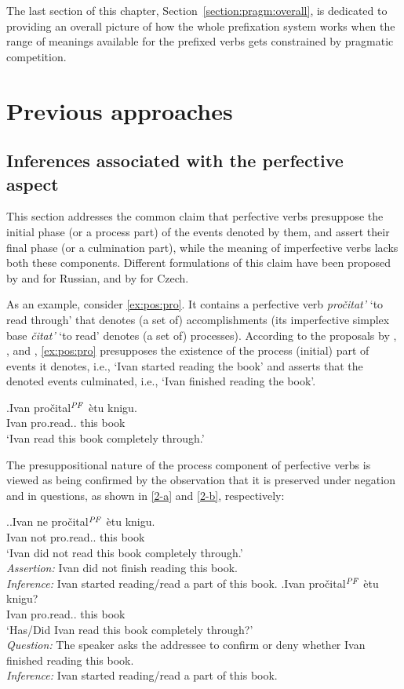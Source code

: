 The last section of this chapter, Section~\ref{section:pragm:overall}, is dedicated to providing an overall picture of how the whole prefixation system works when the range of meanings available for the prefixed verbs gets constrained by pragmatic competition. 

\section{Previous approaches}\label{sec:pragm:old}
\subsection{Inferences associated with the perfective aspect}\label{sec:pragm:old:perf}
This section addresses the common claim that perfective verbs presuppose the initial phase (or a process part) of the events denoted by them, and assert their final phase (or a culmination part), while the meaning of imperfective verbs lacks both these components. Different formulations of this claim have been proposed by \citet{Paducheva:96, Paducheva:11} and \citet{Romanova:06} for Russian, and by \citet{Docekal:09} for Czech.

As an example, consider \ref{ex:pos:pro}. It contains a perfective verb \textit{pro\v{c}itat'} `to read through' that denotes (a set of) accomplishments (its imperfective simplex base \textit{\v{c}itat'} `to read' denotes (a set of) processes). According to the proposals by \citet{Paducheva:96, Paducheva:11}, \citet{Romanova:06}, and \citet{Docekal:09}, \ref{ex:pos:pro} presupposes the existence of the process (initial) part of events it denotes, i.e., `Ivan started reading the book' and asserts that the denoted events culminated, i.e., `Ivan finished reading the book'.

\exg.\label{ex:pos:pro}Ivan pro\v{c}ital$^{\mathit{PF}}$ \`{e}tu knigu.\\
Ivan pro.read.. this book\\
`Ivan read this book completely through.'

The presuppositional nature of the process component of perfective verbs is viewed as being confirmed by the observation that it is preserved under negation and in questions, as shown in \ref{2-a} and \ref{2-b}, respectively: 

\ex.\label{2}\ag.\label{2-a}Ivan ne pro\v{c}ital$^{\mathit{PF}}$ \`{e}tu knigu.\\
Ivan not pro.read.. this book\\
`Ivan did not read this book completely through.'\\
\textit{Assertion:} Ivan did not finish reading this book.\\
\textit{Inference:} Ivan started reading/read a part of this book.
\bg.\label{2-b}Ivan pro\v{c}ital$^{\mathit{PF}}$ \`{e}tu knigu?\\
Ivan pro.read.. this book\\
`Has/Did Ivan read this book completely through?'\\
\textit{Question:} The speaker asks the addressee to confirm or deny whether Ivan finished reading this book.\\
\textit{Inference:} Ivan started reading/read a part of this book.

